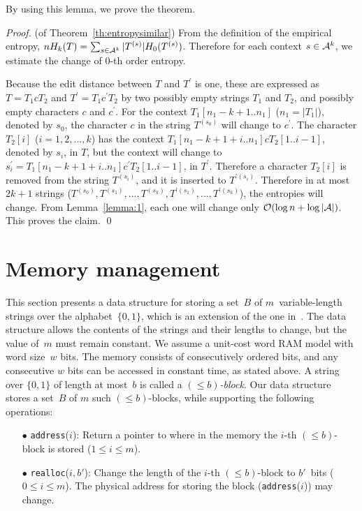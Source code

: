 \documentclass{llncs}
\newcommand{\Order}{\mathcal{O}}
\begin{document}
By using this lemma, we prove the theorem.

\begin{proof}(of Theorem~\ref{th:entropysimilar})
From the definition of the empirical entropy, $n H_k(T) = \sum_{s \in {\cal A}^k} |T^{(s)}| H_0(T^{(s)})$.
Therefore for each context $s \in {\cal A}^k$, we estimate the change of $0$-th order entropy.

Because the edit distance between $T$ and $T^\prime$ is one,
these are expressed as $T = T_1 c T_2$ and $T^\prime = T_1 c^\prime T_2$
by two possibly empty strings $T_1$ and $T_2$, and possibly empty characters
$c$ and $c^\prime$.
For the context $T_1[n_1-k+1..n_1]$ ($n_1 = |T_1|$), denoted by $s_0$,
the character $c$ in the string $T^{(s_0)}$ will change to $c^\prime$.
The character $T_2[i]$ ($i=1,2,\ldots,k$) has the context $T_1[n_1-k+1+i..n_1] c T_2[1..i-1]$, denoted by $s_i$,
in $T$, but the context will change to $s^\prime_i = T_1[n_1-k+1+i..n_1] c^\prime T_2[1..i-1]$, in $T^\prime$.
Therefore a character $T_2[i]$ is removed from the string $T^{(s_i)}$, and it is inserted to $T^{\prime{(s_i)}}$.
Therefore in at most $2k+1$ strings ($T^{(s_0)}, T^{(s_1)}, \ldots, T^{(s_k)}, T^{\prime{(s_1)}}, \ldots, T^{\prime{(s_k)}}$),
the entropies will change.  From Lemma~\ref{lemma:1}, each one will change only $\Order(\log n + \log |{\cal A}|)$.
This proves the claim.
\qed
\end{proof}





\section{Memory management}\label{sec:memory}

This section presents a data structure for storing a set~$B$ of
$m$~variable-length strings over the alphabet~$\{0,1\}$,
which is an extension of the one
in~\cite{NavSad10}.
The data structure allows the contents of the strings and their lengths to
change, but the value of~$m$ must remain constant.
We assume a unit-cost word RAM model with word size~$w$ bits.
The memory consists of consecutively ordered bits, and any consecutive $w$ bits
can be accessed in constant time, as stated above.
A string over $\{0,1\}$ of length at most~$b$ is called
a \emph{$(\leq b)$-block}.
Our data structure stores a set~$B$ of $m$ such $(\leq b)$-blocks,
while supporting the following operations:
\begin{itemize}
\item[{\raise0.3pt\hbox{$\bullet$}}]
  \texttt{address}($i$):
  Return a pointer to where in the memory the $i$-th $(\leq b)$-block
  is stored ($1 \leq i \leq m$).
\item[{\raise0.3pt\hbox{$\bullet$}}]
  \texttt{realloc}($i,b'$):
  Change the length of the $i$-th $(\leq b)$-block to $b'$~bits
  ($0 \leq i \leq m$).
  The physical address for storing the block (\texttt{address}($i$)) may change.
\end{itemize}
\end{document}
